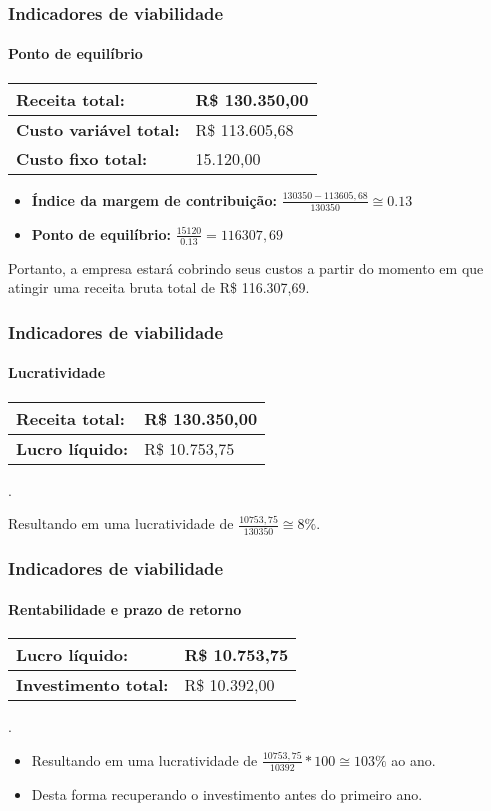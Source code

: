 \documentclass{beamer}
\begin{document}
\begin{frame}
  \frametitle{Indicadores de viabilidade}
  \framesubtitle{Ponto de equilíbrio}

  \begin{tabular}{| l | l |}
    \hline
    \textbf{Receita total:} & R\$ 130.350,00 \\ \hline
    \textbf{Custo variável total:} & R\$ 113.605,68 \\ \hline
    \textbf{Custo fixo total:} & 15.120,00 \\ \hline
  \end{tabular}
  
  \begin{itemize}
    \item \textbf{Índice da margem de contribuição:} $\frac{130350 - 113605,68}{130350} \cong 0.13$
    \item \textbf{Ponto de equilíbrio:} $\frac{15120}{0.13} = 116307,69$
  \end{itemize}
  
  Portanto, a empresa estará cobrindo seus custos a partir do momento em que atingir uma receita bruta total de R\$ 116.307,69.
\end{frame}

\begin{frame}
  \frametitle{Indicadores de viabilidade}
  \framesubtitle{Lucratividade}
  
  \begin{tabular}{| l | l |}
    \hline
    \textbf{Receita total:} & R\$ 130.350,00 \\ \hline
    \textbf{Lucro líquido:} & R\$ 10.753,75 \\ \hline
  \end{tabular}
  
  .\newline \newline
  
  Resultando em uma lucratividade de $\frac{10753,75}{130350} \cong 8\%$.
\end{frame}

\begin{frame}
  \frametitle{Indicadores de viabilidade}
  \framesubtitle{Rentabilidade e prazo de retorno}

  \begin{tabular}{| l | l |}
    \hline
    \textbf{Lucro líquido:} & R\$ 10.753,75 \\ \hline
    \textbf{Investimento total:} & R\$ 10.392,00 \\ \hline
  \end{tabular}
  
  .\newline \newline
  
  \begin{itemize}
    \item Resultando em uma lucratividade de $\frac{10753,75}{10392}*100 \cong 103\%$ ao ano.
    \item Desta forma recuperando o investimento antes do primeiro ano.
  \end{itemize}
\end{frame}
\end{document}
